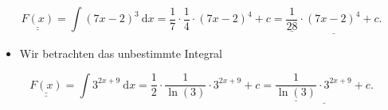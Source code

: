 \documentclass[10pt]{article}
\begin{document}
\begin{equation*}
\underline{\underline{F(x)}}=\int(7 x-2)^{3} \mathrm{~d} x=\frac{1}{7} \cdot \frac{1}{4} \cdot(7 x-2)^{4}+c=\underline{\underline{\frac{1}{28}} \cdot(7 x-2)^{4}+c .} \tag{1.2}
\end{equation*}


\begin{itemize}
  \item Wir betrachten das unbestimmte Integral
\end{itemize}


\begin{equation*}
\underline{\underline{F(x)}}=\int 3^{2 x+9} \mathrm{~d} x=\frac{1}{2} \cdot \frac{1}{\ln (3)} \cdot 3^{2 x+9}+c=\underline{\underline{\frac{1}{\ln (3)}} \cdot 3^{2 x+9}+c .} \tag{1.3}
\end{equation*}
\end{document}
